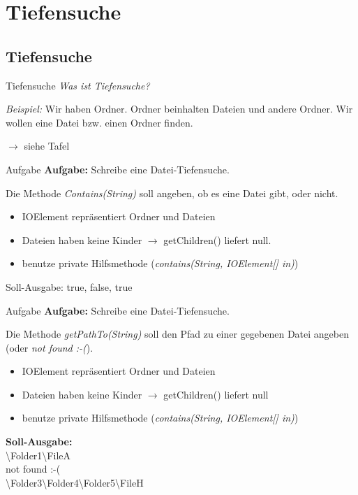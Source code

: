 \documentclass[18pt]{beamer}
\begin{document}
\section{Tiefensuche}
\subsection*{Tiefensuche}
\begin{frame}{Tiefensuche}
	\emph{Was ist Tiefensuche?}
	
	\emph{Beispiel:} Wir haben Ordner. Ordner beinhalten Dateien und andere Ordner. Wir wollen eine Datei bzw. einen Ordner finden.
	
	$\rightarrow$ siehe Tafel
\end{frame}

\begin{frame}{Aufgabe}
	\textbf{Aufgabe:} Schreibe eine Datei-Tiefensuche.
	
	Die Methode \emph{Contains(String)} soll angeben, ob es eine Datei gibt, oder nicht.
	
	\begin{itemize}
		\item IOElement repräsentiert Ordner und Dateien
		\item Dateien haben keine Kinder $\rightarrow$ getChildren() liefert null.
		\item benutze private Hilfsmethode (\emph{contains(String, IOElement[] in)})
	\end{itemize}
	
	Soll-Ausgabe: true, false, true
\end{frame}

\begin{frame}{Aufgabe}
	\textbf{Aufgabe:} Schreibe eine Datei-Tiefensuche.
	
	Die Methode \emph{getPathTo(String)} soll den Pfad zu einer gegebenen Datei angeben (oder \emph{not found :-(}).
	
	\begin{itemize}
		\item IOElement repräsentiert Ordner und Dateien
		\item Dateien haben keine Kinder $\rightarrow$ getChildren() liefert null
		\item benutze private Hilfsmethode (\emph{contains(String, IOElement[] in)})
	\end{itemize}
	
	\textbf{Soll-Ausgabe:} \\
				\textbackslash Folder1\textbackslash FileA\\
				not found :-(\\
				\textbackslash Folder3\textbackslash Folder4\textbackslash Folder5\textbackslash FileH
\end{frame}
\end{document}
